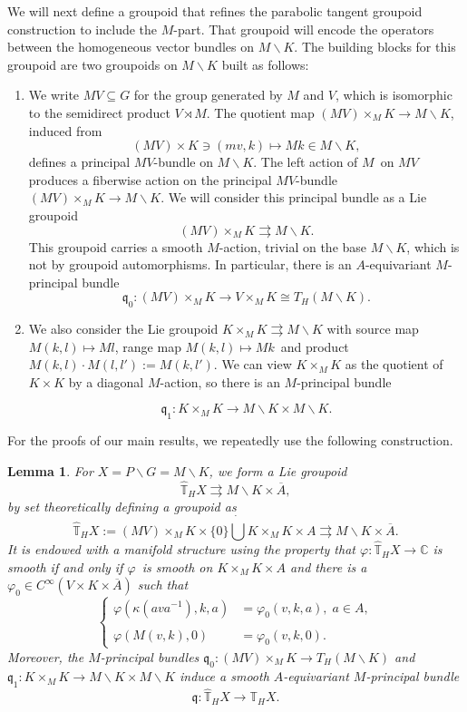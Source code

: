 \documentclass[a4paper,reqno]{amsart}
\numberwithin{equation}{section}
\def\C{\mathbb{C}}
\newtheorem{lemma}[thm]{Lemma}
\theoremstyle{definition}
\theoremstyle{remark}
\begin{document}
We will next define a groupoid that refines the parabolic tangent groupoid construction to include the $M$-part. That groupoid will encode the operators between the homogeneous vector bundles on $M\backslash K$. The building blocks for this groupoid are  two groupoids on $M\backslash K$ built as follows:
\begin{enumerate}
\item We write $MV\subseteq G$ for the group generated by $M$ and $V$, which is isomorphic to the semidirect product $V\rtimes M$. The quotient map $(MV)\times_M K\to M\backslash K$, induced from 
$$(MV)\times K\ni (mv,k) \mapsto Mk\in M\backslash K,$$
defines a principal $MV$-bundle on $M\backslash K$. The left action of $M$ on $MV$ produces a fiberwise action on the principal $MV$-bundle $(MV)\times_M K\to M\backslash K$. We will consider this principal bundle as a Lie groupoid
$$(MV)\times_M K\rightrightarrows M\backslash K.$$
This groupoid carries a smooth $M$-action, trivial on the base $M\backslash K$, which is not by groupoid automorphisms. In particular, there is an $A$-equivariant $M$-principal bundle
$$\mathfrak{q}_0:(MV)\times_M K\to V\times_MK\cong T_H(M\backslash K).$$
\item We also consider the Lie groupoid $K\times_M K\rightrightarrows M\backslash K$ with source map $M(k,l)\mapsto Ml$, range map $M(k,l)\mapsto Mk$ and product $M(k,l)\cdot M(l,l'):=M(k,l')$. We can view $K\times_MK$ as the quotient of $K\times K$ by a diagonal $M$-action, so there is an $M$-principal bundle

$$\mathfrak{q}_1:K\times_MK\to M\backslash K\times M\backslash K.$$

\end{enumerate}


For the proofs of our main results, we repeatedly  use the following construction.






\begin{lemma}
\label{lnljnljknkjlnad}
For $X=P\backslash G=M\backslash K$, we form a Lie groupoid 
$$\widehat{\mathbb{T}}_HX\rightrightarrows M\backslash K \times \overline{A},$$
by set theoretically defining a groupoid as
$$\widehat{\mathbb{T}}_HX:=(MV)\times_M K\times \{0\}\dot{\bigcup} K\times_M K\times A\rightrightarrows M\backslash K \times \overline{A}.$$
It is endowed with a manifold structure using the property that $\varphi:\widehat{\mathbb{T}}_HX\to \C$ is smooth if and only if $\varphi$ is smooth on $K\times_M K\times A$ and there is a $\varphi_0\in C^\infty(V\times K\times \overline{A})$ such that 
$$\begin{cases}
\varphi(\kappa(ava^{-1}),k,a)&=\varphi_0(v,k,a), \; a\in A,\\
{}\\
\varphi(M(v,k),0)&=\varphi_0(v,k,0).
\end{cases}$$
Moreover, the $M$-principal bundles $\mathfrak{q}_0:(MV)\times_M K\to T_H(M\backslash K)$ and $\mathfrak{q}_1:K\times_MK\to M\backslash K\times M\backslash K$ induce a smooth $A$-equivariant $M$-principal bundle
$$\mathfrak{q}:\widehat{\mathbb{T}}_HX \to \mathbb{T}_HX.$$
\end{lemma}
\end{document}

